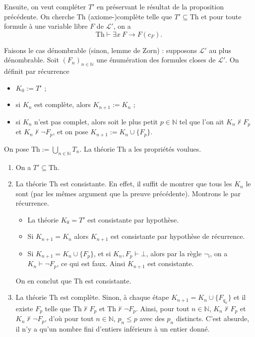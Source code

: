 \documentclass[./main]{subfiles}
\begin{document}
  Ensuite, on veut compléter $T'$ en préservant le résultat de la proposition précédente.
  On cherche $\mathrm{Th}$ (axiome-)complète telle que $T' \subseteq \mathrm{Th}$ et pour toute formule à une variable libre $F$ de $\mathcal{L}'$, on a \[
  \mathrm{Th} \vdash \exists x \: F \to F(c_F)
  .\]

  Faisons le cas dénombrable (sinon, lemme de Zorn) : supposons $\mathcal{L}'$ au plus dénombrable.
  Soit $(F_n)_{n \in \mathds{N}}$ une énumération des formules closes de $\mathcal{L}'$.
  On définit par récurrence
  \begin{itemize}
    \item $K_0 := T'$ ;
    \item si $K_n$ est complète, alors $K_{n+1} := K_n$ ;
    \item si $K_n$ n'est pas complet, alors soit le plus petit $p \in \mathds{N}$ tel que l'on ait $K_n \nvdash F_p$ et $K_n \nvdash \lnot F_p$, et on pose $K_{n+1} := K_n \cup \{F_p\}$.
  \end{itemize}

  \begin{lem}
    On pose $\mathrm{Th} := \bigcup_{n \in \mathds{N}} T_n$.
    La théorie $\mathrm{Th}$ a les propriétés voulues.
  \end{lem}

  \begin{prv}
    \begin{enumerate}
      \item On a $T' \subseteq \mathrm{Th}$.
      \item La théorie $\mathrm{Th}$ est consistante.
        En effet, il suffit de montrer que tous les $K_n$ le sont (par les mêmes argument que la preuve précédente).
        Montrons le par récurrence.
        \begin{itemize}
          \item La théorie $K_0 = T'$ est consistante par hypothèse.
          \item Si $K_{n+1} = K_n$ alors $K_{n+1}$ est consistante par hypothèse de récurrence.
          \item Si $K_{n+1} = K_n \cup \{F_p\}$, et si $K_n, F_p \vdash \bot$, 
            alors par la règle $\lnot_\mathsf{i}$, on a $K_n \vdash \lnot F_p$, ce qui est faux.
            Ainsi $K_{n+1}$ est consistante.
        \end{itemize}
        On en conclut que $\mathrm{Th}$ est consistante.
      \item La théorie $\mathrm{Th}$ est complète.
        Sinon, à chaque étape $K_{n+1} = K_n \cup \{F_{q_n}\}$ et il existe $F_p$ telle que $\mathrm{Th} \nvdash F_p$ et $\mathrm{Th} \nvdash \lnot F_p$.
        Ainsi, pour tout $n \in \mathds{N}$, $K_n \nvdash F_p$ et $K_n \nvdash \lnot F_p$, d'où pour tout $n \in \mathds{N}$, $p_n \le p$ avec des $p_n$ distincts.
        C'est absurde, il n'y a qu'un nombre fini d'entiers inférieurs à un entier donné.
    \end{enumerate}
  \end{prv}
\end{document}

